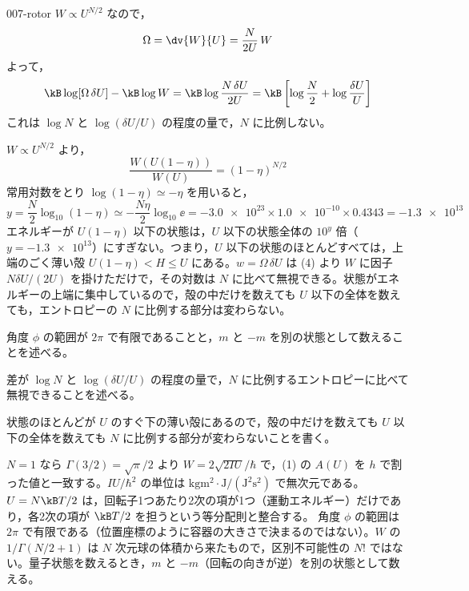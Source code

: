 \documentclass[uplatex,dvipdfmx,a4paper,11pt]{jsarticle}
\begin{document}
\begin{kaisetsu}{007-rotor}
 $W\propto U^{N/2}$ なので，
\[\Omega=\dv{W}{U}=\frac{N}{2U}\,W\]
よって，
\[\kB\log[\Omega\,\delta U]-\kB\log W=\kB\log\frac{N\,\delta U}{2U}=\kB\left[\log\frac{N}{2}+\log\frac{\delta U}{U}\right]\]
これは $\log N$ と $\log(\delta U/U)$ の程度の量で，$N$ に比例しない。

 $W\propto U^{N/2}$ より，
\[\frac{W(U(1-\eta))}{W(U)}=(1-\eta)^{N/2}\]
常用対数をとり $\log(1-\eta)\simeq-\eta$ を用いると，
\[y=\frac{N}{2}\log_{10}(1-\eta)\simeq-\frac{N\eta}{2}\log_{10}\ee=-\num{3.0e23}\times\num{1.0e-10}\times\num{0.4343}=-\num{1.3e13}\]
エネルギーが $U(1-\eta)$ 以下の状態は，$U$ 以下の状態全体の $10^{y}$ 倍（$y=-\num{1.3e13}$）にすぎない。つまり，$U$ 以下の状態のほとんどすべては，上端のごく薄い殻 $U(1-\eta)<H\le U$ にある。$w=\Omega\,\delta U$ は (4) より $W$ に因子 $N\delta U/(2U)$ を掛けただけで，その対数は $N$ に比べて無視できる。状態がエネルギーの上端に集中しているので，殻の中だけを数えても $U$ 以下の全体を数えても，エントロピーの $N$ に比例する部分は変わらない。
\begin{ronten}
  \item {} 角度 $\phi$ の範囲が $2\pi$ で有限であることと，$m$ と $-m$ を別の状態として数えることを述べる。
  \item {} 差が $\log N$ と $\log(\delta U/U)$ の程度の量で，$N$ に比例するエントロピーに比べて無視できることを述べる。
  \item {} 状態のほとんどが $U$ のすぐ下の薄い殻にあるので，殻の中だけを数えても $U$ 以下の全体を数えても $N$ に比例する部分が変わらないことを書く。
\end{ronten}
\kenzan $N=1$ なら $\Gamma(3/2)=\sqrt{\pi}/2$ より $W=2\sqrt{2IU}/\hbar$ で，(1) の $A(U)$ を $h$ で割った値と一致する。$IU/\hbar^{2}$ の単位は $\unit{\kilogram\metre\squared}\cdot\unit{\joule}/(\unit{\joule\squared\second\squared})$ で無次元である。$U=N\kB T/2$ は，回転子1つあたり2次の項が1つ（運動エネルギー）だけであり，各2次の項が $\kB T/2$ を担うという等分配則と整合する。
\tsumazuki 角度 $\phi$ の範囲は $2\pi$ で有限である（位置座標のように容器の大きさで決まるのではない）。$W$ の $1/\Gamma(N/2+1)$ は $N$ 次元球の体積から来たもので，区別不可能性の $N!$ ではない。量子状態を数えるとき，$m$ と $-m$（回転の向きが逆）を別の状態として数える。
\end{kaisetsu}
\end{document}
